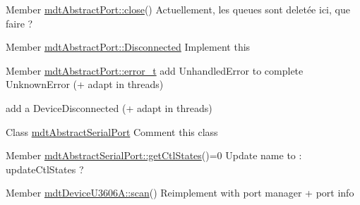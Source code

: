 \label{todo__todo000007}
\hypertarget{todo__todo000007}{}
 
\begin{DoxyDescription}
\item[Member \hyperlink{classmdt_abstract_port_a1ace1a2bd1a04f16952980e247b04800}{mdtAbstractPort::close}() ]Actuellement, les queues sont deletée ici, que faire ? 
\end{DoxyDescription}

\label{todo__todo000008}
\hypertarget{todo__todo000008}{}
 
\begin{DoxyDescription}
\item[Member \hyperlink{classmdt_abstract_port_ad4121bb930c95887e77f8bafa065a85ea8b70726d03f75a691ac4ad65722a5f3c}{mdtAbstractPort::Disconnected} ]Implement this 
\end{DoxyDescription}

\label{todo__todo000006}
\hypertarget{todo__todo000006}{}
 
\begin{DoxyDescription}
\item[Member \hyperlink{classmdt_abstract_port_ad4121bb930c95887e77f8bafa065a85e}{mdtAbstractPort::error\_\-t} ]add UnhandledError to complete UnknownError (+ adapt in threads) 

add a DeviceDisconnected (+ adapt in threads) 
\end{DoxyDescription}

\label{todo__todo000025}
\hypertarget{todo__todo000025}{}
 
\begin{DoxyDescription}
\item[Class \hyperlink{classmdt_abstract_serial_port}{mdtAbstractSerialPort} ]Comment this class 
\end{DoxyDescription}

\label{todo__todo000026}
\hypertarget{todo__todo000026}{}
 
\begin{DoxyDescription}
\item[Member \hyperlink{classmdt_abstract_serial_port_aaeacd26b220ab0f8c521cef74edfafdd}{mdtAbstractSerialPort::getCtlStates}()=0 ]Update name to : updateCtlStates ? 
\end{DoxyDescription}

\label{todo__todo000001}
\hypertarget{todo__todo000001}{}
 
\begin{DoxyDescription}
\item[Member \hyperlink{classmdt_device_u3606_a_a3a31558c573466fc1534b43e6ee7e327}{mdtDeviceU3606A::scan}() ]Reimplement with port manager + port info 
\end{DoxyDescription}

